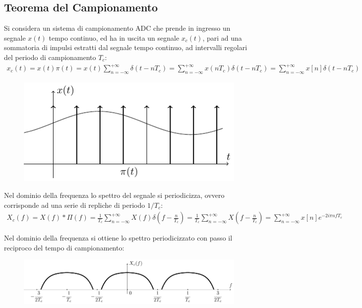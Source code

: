 \documentclass{article}
\numberwithin{equation}{subsection}
\begin{document}
\subsection{Teorema del Campionamento}
\label{sec:teorema-campionamento}

Si considera un sistema di campionamento ADC che prende in ingresso un segnale $x(t)$ tempo continuo, ed ha in uscita un segnale $x_c(t)$, pari ad una 
sommatoria di impulsi estratti dal segnale tempo continuo, ad intervalli regolari del periodo di campionamento $T_c$:
\begin{gather*}
    x_c(t)=x(t)\pi(t)=x(t)\displaystyle\sum_{n=-\infty}^{+\infty}\delta(t-nT_c)=\sum_{n=-\infty}^{+\infty}x(nT_c)\delta(t-nT_c)=\sum_{n=-\infty}^{+\infty}x[n]\delta(t-nT_c)
\end{gather*}
\begin{figure}[H]%
    \centering
    \includegraphics{segnale-campionato.pdf}%
\end{figure}
Nel dominio della frequenza lo spettro del segnale si periodicizza, ovvero corrisponde ad una serie di repliche di periodo $1/T_c$:
\begin{gather*}
    X_c(f)=X(f)*\Pi(f)=\displaystyle\frac{1}{T_c}\sum_{n=-\infty}^{+\infty}X(f)\delta\left(f-\frac{n}{T_c}\right)=\frac{1}{T_c}\sum_{n=-\infty}^{+\infty}X\left(f-\frac{n}{T_c}\right)=\sum_{n=-\infty}^{+\infty}x[n]e^{-2i\pi nfT_c}
\end{gather*}

Nel dominio della frequenza si ottiene lo spettro periodicizzato con passo il reciproco del tempo di campionamento: 
\begin{figure}[H]%
    \centering
    \includegraphics{segnale-campionato-frequenza.pdf}%
\end{figure}
\end{document}
